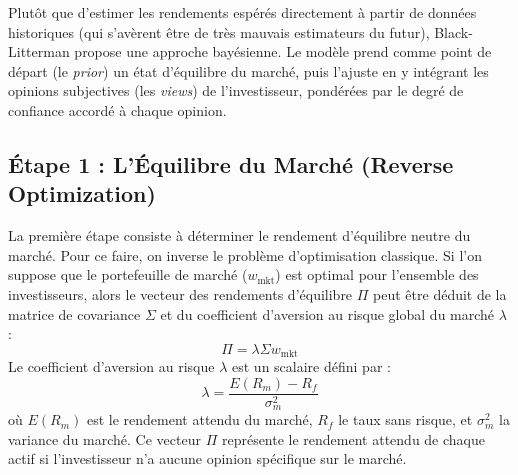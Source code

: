 Plutôt que d'estimer les rendements espérés directement à partir de données historiques (qui s'avèrent être de très mauvais estimateurs du futur), Black-Litterman propose une approche bayésienne. Le modèle prend comme point de départ (le \textit{prior}) un état d'équilibre du marché, puis l'ajuste en y intégrant les opinions subjectives (les \textit{views}) de l'investisseur, pondérées par le degré de confiance accordé à chaque opinion.

\subsection{Étape 1 : L'Équilibre du Marché (Reverse Optimization)}
La première étape consiste à déterminer le rendement d'équilibre neutre du marché. Pour ce faire, on inverse le problème d'optimisation classique. Si l'on suppose que le portefeuille de marché ($w_{\text{mkt}}$) est optimal pour l'ensemble des investisseurs, alors le vecteur des rendements d'équilibre $\Pi$ peut être déduit de la matrice de covariance $\Sigma$ et du coefficient d'aversion au risque global du marché $\lambda$ :
\begin{equation}
    \Pi = \lambda \Sigma w_{\text{mkt}}
\end{equation}
Le coefficient d'aversion au risque $\lambda$ est un scalaire défini par :
\begin{equation}
    \lambda = \frac{E(R_m) - R_f}{\sigma_m^2}
\end{equation}
où $E(R_m)$ est le rendement attendu du marché, $R_f$ le taux sans risque, et $\sigma_m^2$ la variance du marché. Ce vecteur $\Pi$ représente le rendement attendu de chaque actif si l'investisseur n'a aucune opinion spécifique sur le marché.

